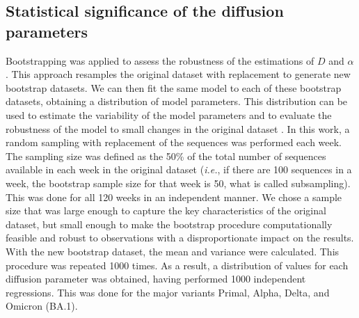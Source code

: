 



\subsection{Statistical significance of the diffusion parameters}

Bootstrapping was applied to assess the robustness of the estimations of $D$ and $\alpha$. This approach resamples the original dataset with replacement to generate new bootstrap datasets. We can then fit the same model to each of these bootstrap datasets, obtaining a distribution of model parameters. This distribution can be used to estimate the variability of the model parameters and to evaluate the robustness of the model to small changes in the original dataset \cite{efron1979}. In this work, a random sampling with replacement of the sequences was performed each week. The sampling size was defined as the 50\% of the total number of sequences available in each week in the original dataset (\textit{i.e.}, if there are 100 sequences in a week, the bootstrap sample size for that week is 50, what is called subsampling). This was done for all 120 weeks in an independent manner. We chose a sample size that was large enough to capture the key characteristics of the original dataset, but small enough to make the bootstrap procedure computationally feasible and robust to observations with a disproportionate impact on the results. With the new bootstrap dataset, the mean and variance were calculated. This procedure was repeated 1000 times. As a result, a distribution of values for each diffusion parameter was obtained, having performed 1000 independent regressions. This was done for the major variants Primal, Alpha, Delta, and Omicron (BA.1).

\vfill

\pagebreak



